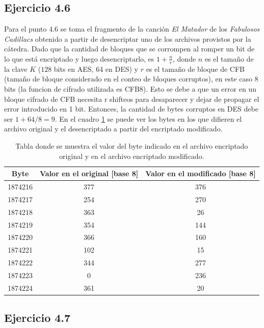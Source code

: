 \documentclass[a4paper,10pt]{article}
\begin{document}
\subsection{Ejercicio 4.6}
Para el punto 4.6 se toma el fragmento de la canci\'on \emph{El Matador} de los \emph{Fabulosos Cadillacs} 
obtenido a partir de desencriptar uno de los archivos provistos por la c\'atedra.
Dado que la cantidad de bloques que se corrompen al romper un bit de lo que est\'a encriptado y luego
desencriptarlo, es $1 + \frac{n}{r}$, donde $n$ es el tamaño de la clave $K$ ($128$ bits en AES, 64 en DES) y $r$ es el tamaño de
bloque de CFB (tamaño de bloque considerado en el conteo de bloques corruptos), en este caso 8 bits (la funcion de cifrado utilizada es CFB8). Esto se debe a que un error en un bloque cifrado de CFB necesita r shifteos para desaparecer y dejar de propagar el error introducido en 1 bit. Entonces, la cantidad de bytes corruptos en DES debe ser $1 + 64/8 = 9$.
En el cuadro \ref{table46} se puede ver los bytes en los que difieren el archivo original y el desencriptado a partir
del encriptado modificado.
\begin{table}
\begin{center}
\begin{tabular}{|c|c|c|}
\hline
Byte & Valor en el original [base 8] & Valor en el modificado [base 8]\\
\hline
\hline
1874216 & 377 & 376 \\
1874217 & 254 & 270 \\
1874218 & 363 & 26 \\
1874219 & 354 & 144 \\
1874220 & 366 & 160 \\
1874221 & 102 & 15 \\
1874222 & 344 & 277 \\
1874223 & 0 & 236 \\
1874224 & 361 & 20 \\
\hline
\end{tabular}
\end{center}
\caption{Tabla donde se muestra el valor del byte indicado en el archivo encriptado original y en el archivo encriptado modificado.}
\label{table46}
\end{table}

\subsection{Ejercicio 4.7}
\end{document}
